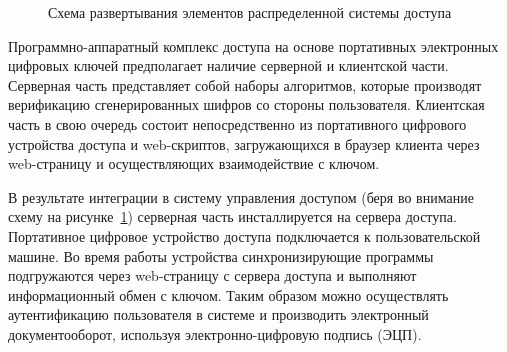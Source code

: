 \begin{figure}[ht]
\center{\texttt{[image: 1-5-2]}}
\caption{Схема развертывания элементов распределенной системы доступа}
\label{ris:1.5.2}
\end{figure} 

Программно-аппаратный комплекс доступа на основе портативных
электронных цифровых ключей предполагает наличие серверной и клиентской части.
Серверная часть представляет собой наборы алгоритмов, которые производят
верификацию сгенерированных шифров со стороны пользователя. Клиентская часть в
свою очередь состоит непосредственно из портативного цифрового устройства
доступа и web-скриптов, загружающихся в браузер клиента через web-страницу и
осуществляющих взаимодействие с ключом.

В результате интеграции в систему управления доступом (беря во внимание схему
на рисунке~\ref{ris:1.5.2}) серверная часть инсталлируется на сервера доступа.
Портативное цифровое устройство доступа подключается к пользовательской машине. Во время
работы устройства синхронизирующие программы подгружаются через web-страницу с
сервера доступа и выполняют информационный обмен с ключом. Таким образом можно
осуществлять аутентификацию пользователя в системе и производить электронный
документооборот, используя электронно-цифровую подпись (ЭЦП).